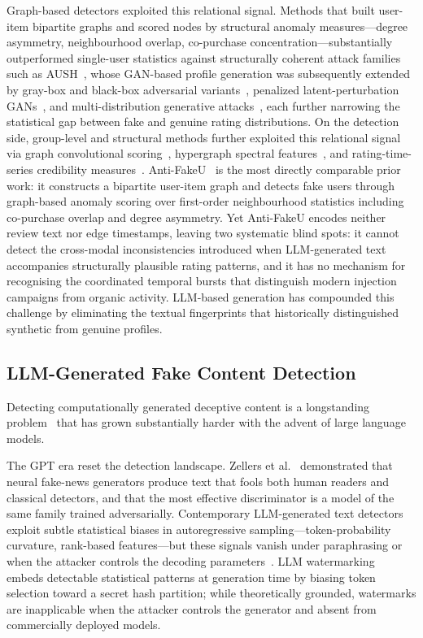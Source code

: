 Graph-based detectors exploited this relational signal.
Methods that built user-item bipartite graphs and scored nodes by structural
anomaly measures—degree asymmetry, neighbourhood overlap, co-purchase
concentration—substantially outperformed single-user statistics against
structurally coherent attack families such as AUSH~\cite{lin2020aush}, whose
GAN-based profile generation was subsequently extended by gray-box and
black-box adversarial variants~\cite{wang2022graybox,lin2022shilling,liu2024novel},
penalized latent-perturbation GANs~\cite{nawara2025penalized}, and
multi-distribution generative attacks~\cite{zhou2026mdmgansa,yu2025rupgan}, each
further narrowing the statistical gap between fake and genuine rating
distributions.
On the detection side, group-level and structural methods further exploited
this relational signal via graph convolutional
scoring~\cite{wang2022detecting}, hypergraph spectral
features~\cite{li2021fusing}, and rating-time-series credibility
measures~\cite{zhou2018shilling}.
Anti-FakeU~\cite{you2023antifakeu} is the most directly comparable prior
work: it constructs a bipartite user-item graph and detects fake users through
graph-based anomaly scoring over first-order neighbourhood statistics including
co-purchase overlap and degree asymmetry.
Yet Anti-FakeU encodes neither review text nor edge timestamps, leaving two
systematic blind spots: it cannot detect the cross-modal inconsistencies
introduced when LLM-generated text accompanies structurally plausible rating
patterns, and it has no mechanism for recognising the coordinated temporal
bursts that distinguish modern injection campaigns from organic activity.
LLM-based generation has compounded this challenge by eliminating the textual
fingerprints that historically distinguished synthetic from genuine profiles.

\subsection{LLM-Generated Fake Content Detection}
\label{sec:rel_llm_detection}

Detecting computationally generated deceptive content is a longstanding
problem~\cite{ott2011finding,jindal2008opinion} that has grown substantially
harder with the advent of large language models.

The GPT era reset the detection landscape.
Zellers et al.~\cite{zellers2019defending} demonstrated that neural fake-news
generators produce text that fools both human readers and classical detectors,
and that the most effective discriminator is a model of the same family trained
adversarially.
Contemporary LLM-generated text detectors exploit subtle statistical biases
in autoregressive sampling—token-probability curvature, rank-based
features—but these signals vanish under paraphrasing or when the attacker
controls the decoding parameters~\cite{guo2023close}.
LLM watermarking~\cite{kirchenbauer2023watermark} embeds detectable statistical
patterns at generation time by biasing token selection toward a secret hash
partition; while theoretically grounded, watermarks are inapplicable when the
attacker controls the generator and absent from commercially deployed models.

